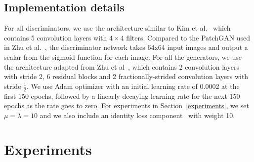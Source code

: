 \documentclass[10pt,twocolumn,letterpaper]{article}
\begin{document}
\subsection{Implementation details} \label{implementation}
For all discriminators, we use the architecture similar to Kim et al.~\cite{DiscoGAN} which contains 5 convolution layers with $4 \times 4$ filters. Compared to the PatchGAN used in Zhu et al.~\cite{CycleGAN}, the discriminator network takes 64x64 input images and output a scalar from the sigmoid function for each image. For all the generators, we use the architecture adapted from Zhu et al~\cite{CycleGAN}, which contains 2 convolution layers with stride 2, 6 residual blocks and 2 fractionally-strided convolution layers with stride $\frac{1}{2}$. We use Adam optimizer \cite{adam} with an initial learning rate of 0.0002 at the first 150 epochs, followed by a linearly decaying learning rate for the next 150 epochs as the rate goes to zero. For experiments in Section~\ref{experiments}, we set $\mu=\lambda=10$ and we also include an identity loss component~\cite{CycleGAN} with weight 10.


\section{Experiments}
\end{document}
